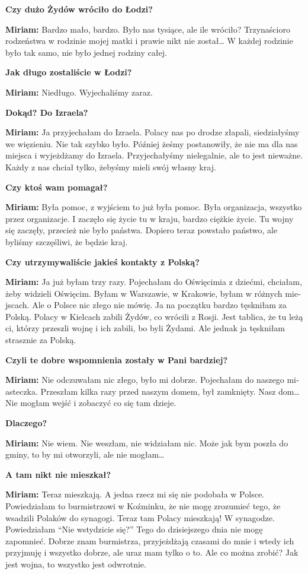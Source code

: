 \begin{otherlanguage}{ngerman}
\textbf{Czy dużo Żydów wróciło do Łodzi? }

\textbf{Miriam:} Bardzo mało, bardzo. Było nas tysiące, ale ile wróciło? Trzynaścioro rodzeństwa w rodzinie mojej matki i prawie nikt nie został… W każdej rodzinie było tak samo, nie było jednej rodziny całej.  

\textbf{Jak długo zostaliście w Łodzi?} 

\textbf{Miriam:} Niedługo. Wyjechaliśmy zaraz.

\textbf{Dokąd? Do Izraela?}

\textbf{Miriam:}  Ja przyjechałam do Izraela. Polacy nas po drodze złapali, siedziałyśmy we więzieniu. Nie tak szybko było. Później żeśmy postanowiły, że nie ma dla nas miejsca i wyjeżdżamy do Izraela. Przyjechałyśmy nielegalnie, ale to jest nieważne. Każdy z nas chciał tylko, żebyśmy mieli swój własny kraj. 

\textbf{Czy ktoś wam pomagał?} 

\textbf{Miriam:}  Była pomoc, z wyjściem to już była pomoc. Była organizacja, wszystko przez organizacje. I zaczęło się życie tu w kraju, bardzo ciężkie życie. Tu wojny się zaczęły, przecież nie było państwa. Dopiero teraz powstało państwo, ale byliśmy szczęśliwi, że będzie kraj. 

\textbf{Czy utrzymywaliście jakieś kontakty z Polską?} 

\textbf{Miriam:} Ja już byłam trzy razy. Pojechałam do Oświęcimia z dziećmi, chciałam, żeby widzieli Oświęcim. Byłam w Warszawie, w Krakowie, byłam w różnych miejscach. Ale o Polsce nic złego nie mówię. Ja na początku bardzo tęskniłam za Polską. Polacy w Kielcach zabili Żydów, co wrócili z Rosji. Jest tablica, że tu leżą ci, którzy przeszli wojnę i ich zabili, bo byli Żydami. Ale jednak ja tęskniłam strasznie za Polską. 

\textbf{Czyli te dobre wspomnienia zostały w Pani bardziej?} 

\textbf{Miriam:}  Nie odczuwałam nic złego, było mi dobrze. Pojechałam do naszego miasteczka. Przeszłam kilka razy przed naszym domem, był zamknięty. Nasz dom… Nie mogłam wejść i zobaczyć co się tam dzieje. 

\textbf{Dlaczego?} 

\textbf{Miriam:} Nie wiem. Nie weszłam, nie widziałam nic. Może jak bym poszła do gminy, to by mi otworzyli, ale nie mogłam… 

\textbf{A tam nikt nie mieszkał? } 

\textbf{Miriam:} Teraz mieszkają. A jedna rzecz mi się nie podobała w Polsce. Powiedziałam to burmistrzowi w Koźminku, że nie mogę zrozumieć tego, że wsadzili Polaków do synagogi. Teraz tam Polacy mieszkają! W synagodze. Powiedziałam "`Nie wstydzicie się?"' Tego do dzisiejszego dnia nie mogę zapomnieć. Dobrze znam burmistrza, przyjeżdżają czasami do mnie i wtedy ich przyjmuję i wszystko dobrze, ale uraz mam tylko o to. Ale co można zrobić? Jak jest wojna, to wszystko jest odwrotnie. 


\end{otherlanguage}
